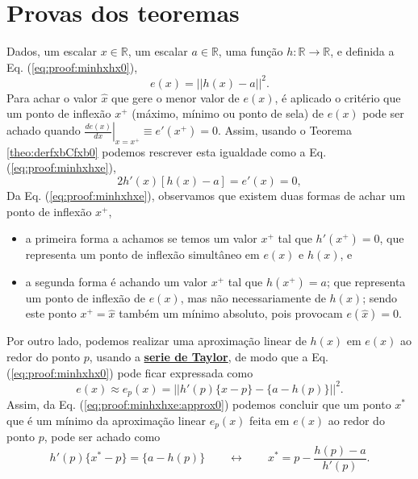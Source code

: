 \section{Provas dos teoremas}
 
\begin{myproofT}\label{proof:theo:minhxhx}
Dados,
um escalar $x \in \mathbb{R}$, 
um escalar $a \in \mathbb{R}$,  
uma função $h:\mathbb{R} \rightarrow \mathbb{R}$, e 
definida a Eq. (\ref{eq:proof:minhxhx0}),
\begin{equation}\label{eq:proof:minhxhx0}
e(x)=||h(x)-a||^2.
\end{equation}
Para achar o valor  $\hat{x}$ que gere o menor valor de $e(x)$, é aplicado
o critério que um ponto de inflexão $x^+$ (máximo, mínimo ou ponto de sela) de $e(x)$ 
pode ser achado quando 
$\left. \frac{d e(x)}{d x }\right|_{x=x^+} \equiv e'(x^+) =0$.
Assim, 
usando o Teorema \ref{theo:derfxbCfxb0} podemos 
rescrever esta igualdade como a Eq. (\ref{eq:proof:minhxhxe}),
\begin{equation}\label{eq:proof:minhxhxe}
2  h'(x) \left[h(x) -a\right] = e'(x)=0,
\end{equation}
Da Eq. (\ref{eq:proof:minhxhxe}), observamos 
que existem duas formas de achar um ponto de inflexão $x^+$,
\begin{itemize}
 \item a primeira forma a achamos se temos um valor $x^+$ tal que $h'(x^+)=0$, 
que representa um ponto de inflexão simultâneo em $e(x)$ e $h(x)$, e
 \item a segunda forma é achando um valor $x^+$ tal que $h(x^+)=a$;
que representa um ponto de inflexão de $e(x)$, mas não
necessariamente de $h(x)$; 
sendo este ponto $x^+=\hat{x}$ também um mínimo absoluto, pois provocam $e(\hat{x})=0$.
\end{itemize}




Por outro lado, podemos realizar uma aproximação linear de $h(x)$ em $e(x)$
ao redor do ponto $p$, usando a \hyperref[def:taylor]{\textbf{serie de Taylor}},
de modo que a Eq. (\ref{eq:proof:minhxhx0}) pode ficar expressada como
\begin{equation}\label{eq:proof:minhxhxe:approx0}
e(x) \approx  e_p(x) = ||h'(p)\{x-p\}-\{a-h(p)\}||^2.
\end{equation}
Assim, da Eq. (\ref{eq:proof:minhxhxe:approx0})
podemos concluir que um ponto $x^*$ que é 
um mínimo da aproximação linear $e_p(x)$ feita em $e(x)$ ao redor do ponto $p$,
pode ser achado como
\begin{equation}\label{eq:proof:minhxhx2}
 h'(p)\{x^*-p\} = \{a-h(p)\} \qquad \leftrightarrow \qquad x^* = p - \frac{h(p)-a}{ h'(p)}.
\end{equation} 


\end{myproofT}

